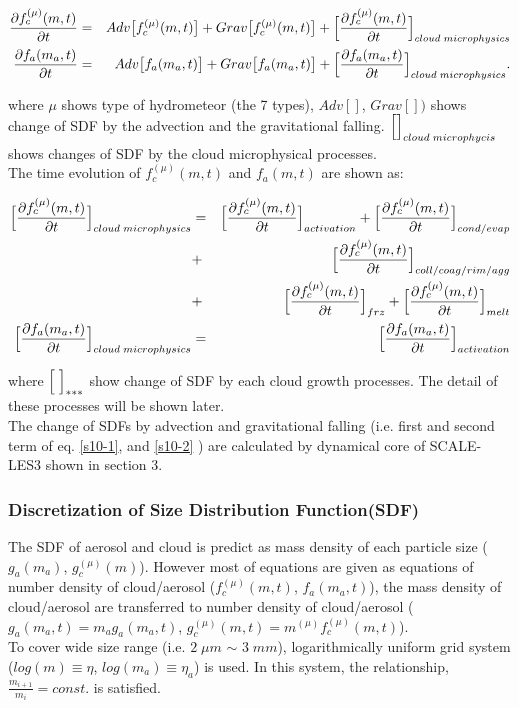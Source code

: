 \begin{eqnarray}
\frac{\partial f^{(\mu)}_{c}(m,t)}{\partial t}&=&Adv\bigl[f^{(\mu)}_{c}(m,t)\bigr]+Grav\bigl[f^{(\mu)}_{c}(m,t)\bigr]+\Bigl[ \frac{\partial f^{(\mu)}_{c}(m,t)}{\partial t}\Bigr ]_{cloud\;microphysics}\label{s10-1}\\
\frac{\partial f_{a}(m_{a},t)}{\partial t}&=&Adv\bigl[f_{a}(m_{a},t)\bigr]+Grav\bigl[f_{a}(m_{a},t)\bigr]+\Bigl[ \frac{\partial f_{a}(m_{a},t)}{\partial t} \Bigr ]_{cloud\;microphysics}.\label{s10-2}
\end{eqnarray}

where $\mu$ shows type of hydrometeor (the 7 types), $Adv[]$, $Grav[])$ shows change of SDF by the advection and the gravitational falling. $\Bigl[ \Bigr]_{cloud\;microphycis}$ shows changes of SDF by the cloud microphysical processes.\\
The time evolution of $f_{c}^{(\mu)}(m,t)$ and $f_{a}(m,t)$ are shown as:

\begin{eqnarray}
\Bigl[ \frac{\partial f_{c}^{(\mu)}(m,t)}{\partial t}\Bigl]_{cloud\;microphysics}&=&\Bigl[\frac{\partial f_{c}^{(\mu)}(m,t)}{\partial t}\Bigr]_{activation}+\Bigl[\frac{\partial f_{c}^{(\mu)}(m,t)}{\partial t}\Bigr]_{cond/evap}\nonumber\\
&+&\Bigl[\frac{\partial f_{c}^{(\mu)}(m,t)}{\partial t}\Bigr]_{coll/coag/rim/agg}\nonumber\\
&+&\Bigl[\frac{\partial f_{c}^{(\mu)}(m,t)}{\partial t}\Bigr]_{frz}+\Bigl[\frac{\partial f_{c}^{(\mu)}(m,t)}{\partial t}\Bigr]_{melt}\nonumber\\
\Bigl[ \frac{\partial f_{a}(m_{a},t)}{\partial t}\Bigl]_{cloud\;microphysics}&=&\Bigl[\frac{\partial f_{a}(m_{a},t)}{\partial t}\Bigr]_{activation}\nonumber
\end{eqnarray}

where $\Bigl[\;\Bigr]_{***}$ show change of SDF by each cloud growth processes. The detail of these processes will be shown later.\\
 The change of SDFs by advection and gravitational falling (i.e. first and second term of eq. \ref{s10-1}, and \ref{s10-2}  ) are calculated by dynamical core of SCALE-LES3 shown in section 3.


\subsubsection{Discretization of Size Distribution Function(SDF)}
The SDF of aerosol and cloud is predict as mass density of each particle size ($g_{a}(m_{a})$, $g_{c}^{(\mu)}(m)$). However most of equations are given as equations of number density of cloud/aerosol ($f_{c}^{(\mu)}(m,t)$, $f_{a}(m_{a},t)$), the mass density of cloud/aerosol are transferred to number density of cloud/aerosol ($g_{a}(m_{a},t)=m_{a}g_{a}(m_{a},t)$, $g_{c}^{(\mu)}(m,t)=m^{(\mu)}f_{c}^{(\mu)}(m,t)$).\\
To cover wide size range (i.e. $2\;\mu m$ $\sim$ $3\;mm$), logarithmically uniform grid system ($log(m)\equiv \eta$, $log(m_{a})\equiv \eta_{a}$) is used. In this system, the relationship, $\frac{m_{i+1}}{m_{i}}=const.$ is satisfied.

